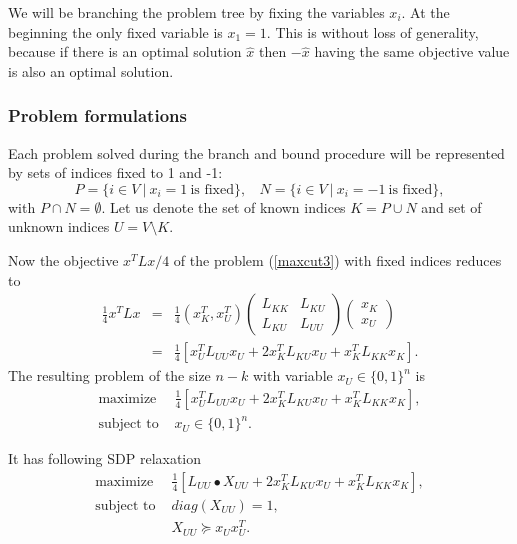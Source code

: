 \documentclass[12pt]{book}
\theoremstyle{definition}
\begin{document}

We will be branching the problem tree by fixing the variables $x_i$.
At the beginning the only fixed variable is $x_1=1$. This is without loss of generality, because if there is an optimal solution $\hat{x}$ then $-\hat{x}$ having the same objective value is also an optimal solution. 


\subsubsection{Problem formulations}
Each problem solved during the branch and bound procedure will be represented by sets of indices fixed to 1 and -1:  
$$P = \{i\in V \ \vert \ x_i =1 \ \mbox{is fixed} \}, \ \ \ \
N = \{i\in V \ \vert \ x_i =-1 \  \mbox{is fixed} \}, $$
with $P\cap N = \emptyset.$ 
Let us denote the set of known indices $K = P\cup N$ and set of unknown indices $U = V\setminus K$. 


Now the objective $x^TLx/4$ of the problem (\ref{maxcut3}) with fixed indices reduces to 
\begin{eqnarray*}
\frac{1}{4}x^TLx &=& \frac{1}{4}(x_K^T , x_U^T )
\left(\begin{array}{rr} L_{KK} & L_{KU} \\ L_{KU} & L_{UU} \end{array}\right)\left(\begin{array}{c} x_K \\ x_U \end{array}\right) \\
&=& \frac{1}{4} \left[ x^T_UL_{UU}x_U +2x^T_KL_{KU}x_U + x^T_KL_{KK}x_K \right].
\end{eqnarray*}
The resulting problem of the size $n-k$ with variable $x_U\in\{0,1\}^n$ 
is 
\begin{equation*}
\begin{array}{ll}
\mbox{maximize } & \frac{1}{4} \left[ x^T_UL_{UU}x_U +2x^T_KL_{KU}x_U + x^T_KL_{KK}x_K \right], \\
\mbox{subject to } & x_U\in\{0,1\}^n.
\end{array}
\end{equation*}


It has following SDP relaxation 
\begin{equation*}
\begin{array}{ll}
\mbox{maximize } & \frac{1}{4} \left[ L_{UU}\bullet X_{UU} +2x^T_KL_{KU}x_U + x^T_KL_{KK}x_K \right], \\
\mbox{subject to } & diag(X_{UU}) = 1, \\
				& X_{UU}\succeq x_Ux_U^T.
\end{array}
\end{equation*}
\end{document}
